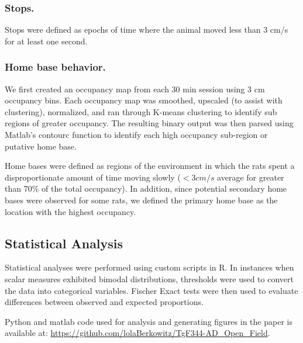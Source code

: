 \documentclass[fleqn,10pt]{wlscirep}
\begin{document}

\subsubsection*{Stops.} Stops were defined as epochs of time where the animal moved less than 3 cm/s for at least one second. 

\subsubsection*{Home base behavior.} 
We first created an occupancy map from each 30 min session using 3 cm occupancy bins. Each occupancy map was smoothed, upscaled (to assist with clustering), normalized, and ran through K-means clustering to identify sub regions of greater occupancy. The resulting binary output was then parsed using Matlab's contourc function to identify each high occupancy sub-region or putative home base. 

Home bases were defined as regions of the environment in which the rats spent a disproportionate amount of time moving slowly ($<3cm/s$ average for greater than 70\% of the total occupancy). In addition, since potential secondary home bases were observed for some rats, we defined the primary home base as the location with the highest occupancy. 

\subsection*{Statistical Analysis} 
Statistical analyses were performed using custom scripts in R. In instances when scalar measures exhibited bimodal distributions, thresholds were used to convert the data into categorical variables. Fischer Exact tests were then used to evaluate differences between observed and expected proportions.

Python and matlab code used for analysis and generating figures in the paper is available at: \url{https://github.com/lolaBerkowitz/TgF344-AD_Open_Field}.
\end{document}
